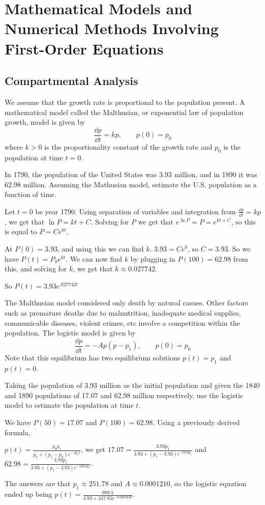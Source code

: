 \documentclass[../diffeq.tex]{subfiles}
\begin{document}
\chapter{Mathematical Models and Numerical Methods Involving First-Order Equations}
\section{Compartmental Analysis}
We assume that the growth rate is proportional to the population present. A mathematical model called the Malthusian, or exponential law of population growth, model is given by 
\[ \frac{\dd p}{\dd t}=kp, \qquad p(0)=p_0 \]
where $k>0$ is the proportionality constant of the growth rate and $p_0$ is the population at time $t=0$.

\begin{example}
    In 1790, the population of the United States was 3.93 million, and in 1890 it was 62.98 million. Assuming the Mathusian model, estimate the U.S. population as a function of time.

    Let $t=0$ be year 1790. Using separation of variables and integration from $\frac{\dd p}{\dd t}=kp$, we get that $\ln P = kt + C$. Solving for $P$ we get that $e^{\ln P}=P=e^{kt+C}$, so this is equal to $P=Ce^{kt}$.

    At $P(0)=3.93$, and using this we can find $k$. $3.93=Ce^0$, so $C=3.93$. So we have $P(t)=P_0e^{kt}$. We can now find $k$ by plugging in $P(100)=62.98$ from this, and solving for $k$, we get that $k\approx 0.027742$.

    So $P(t)=3.93e^{.027742t}$
\end{example}

The Malthusian model considered only death by natural casues. Other factors such as premature deaths due to malnutrition, inadequate medical supplies, communicable diseases, violent crimes, etc involve a competition within the population. The logistic model is given by 
\[ \frac{\dd p}{\dd t}=-Ap(p-p_1), \qquad p(0)=p_0 \]
Note that this equilibrium has two equilibrium solutions $p(t)=p_1$ and $p(t)=0$.

\begin{example}
    Taking the population of 3.93 million as the initial population and given the 1840 and 1890 populations of 17.07 and 62.98 million respectively, use the logistic model to estimate the population at time $t$.

    We have $P(50)=17.07$ and $P(100)=62.98$. Using a previously derived formula, 
    
    $p(t)=\frac{p_0p_1}{p_0+(p_1-p_0)e^{-Ap_1t}}$, we get $17.07=\frac{3.93p_1}{3.93+(p_1-3.93)e^{-50Ap_1}}$ and $62.98=\frac{3.93p_1}{3.93+(p_1-3.93)e^{-100Ap_1}}$. 

    The answers are that $p_1\approx 251.78$ and $A\approx 0.0001210$, so the logistic equation ended up being $p(t)=\frac{989.5}{3.93+247.85e^{-0.030463t}}$.
\end{example}
\end{document}
